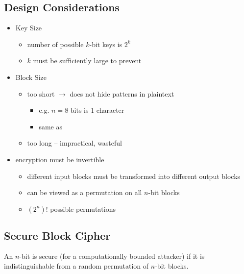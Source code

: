 \documentclass[draft]{article}
\begin{document}
\subsection{Design Considerations}
\begin{itemize}[nosep]
    \item Key Size
          \begin{itemize}[nosep]
              \item number of possible $k$-bit keys is $2^k$
              \item $k$ must be sufficiently large to prevent 
          \end{itemize}
    \item Block Size
          \begin{itemize}
              \item too short $\rightarrow$ does not hide patterns in plaintext
                    \begin{itemize}
                        \item e.g. $n=8$ bits is 1 character
                        \item same as 
                    \end{itemize}
              \item too long -- impractical, wasteful
          \end{itemize}
    \item encryption must be invertible
          \begin{itemize}
              \item different input blocks must be transformed into different output blocks
              \item can be viewed as a permutation on all $n$-bit blocks
              \item $(2^n)!$ possible permutations
          \end{itemize}
\end{itemize}
\subsection{Secure Block Cipher}
An $n$-bit  is secure (for a computationally bounded attacker) if it is indistinguishable from a random permutation of $n$-bit blocks.
\end{document}
